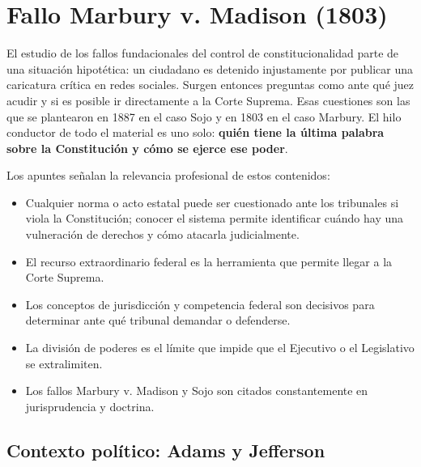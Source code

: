 \documentclass[12pt,oneside,a4paper]{book}
\begin{document}
\tableofcontents

\chapter{Fallo Marbury v. Madison (1803)}

El estudio de los fallos fundacionales del control de constitucionalidad parte de una situación hipotética: un ciudadano es detenido injustamente por publicar una caricatura crítica en redes sociales. Surgen entonces preguntas como ante qué juez acudir y si es posible ir directamente a la Corte Suprema. Esas cuestiones son las que se plantearon en 1887 en el caso Sojo y en 1803 en el caso Marbury. El hilo conductor de todo el material es uno solo: \textbf{quién tiene la última palabra sobre la Constitución y cómo se ejerce ese poder}.

\begin{note}
Los apuntes señalan la relevancia profesional de estos contenidos:
\begin{itemize}
    \item Cualquier norma o acto estatal puede ser cuestionado ante los tribunales si viola la Constitución; conocer el sistema permite identificar cuándo hay una vulneración de derechos y cómo atacarla judicialmente.
    \item El recurso extraordinario federal es la herramienta que permite llegar a la Corte Suprema.
    \item Los conceptos de jurisdicción y competencia federal son decisivos para determinar ante qué tribunal demandar o defenderse.
    \item La división de poderes es el límite que impide que el Ejecutivo o el Legislativo se extralimiten.
    \item Los fallos Marbury v. Madison y Sojo son citados constantemente en jurisprudencia y doctrina.
\end{itemize}
\end{note}

\section{Contexto político: Adams y Jefferson}
\end{document}
